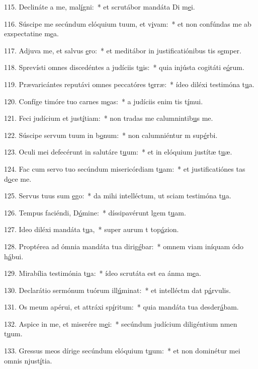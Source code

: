 115. Declináte a me, mal\uline{í}gni:~* et scrutábor mandáta Di m\uline{e}i.\par 
116. Súscipe me secúndum elóquium tuum, et v\uline{i}vam:~* et non confúndas me ab exspectatine m\uline{e}a.\par 
117. Adjuva me, et salvus \uline{e}ro:~* et meditábor in justificatiónibus tis s\uline{e}mper.\par 
118. Sprevísti omnes discedéntes a judíciis t\uline{u}is:~* quia injústa cogitáti e\uline{ó}rum.\par 
119. Prævaricántes reputávi omnes peccatóres t\uline{e}rræ:~* ídeo diléxi testimóna t\uline{u}a.\par 
120. Confíge timóre tuo carnes m\uline{e}as:~* a judíciis enim tis t\uline{í}mui.\par 
121. Feci judícium et just\uline{í}tiam:~* non tradas me calumnintib\uline{u}s me.\par 
122. Súscipe servum tuum in b\uline{o}num:~* non calumniéntur m sup\uline{é}rbi.\par 
123. Oculi mei defecérunt in salutáre t\uline{u}um:~* et in elóquium justítæ t\uline{u}æ.\par 
124. Fac cum servo tuo secúndum misericórdiam t\uline{u}am:~* et justificatiónes tas d\uline{o}ce me.\par 
125. Servus tuus sum \uline{e}go:~* da mihi intelléctum, ut sciam testimóna t\uline{u}a.\par 
126. Tempus faciéndi, D\uline{ó}mine:~* díssipavérunt lgem t\uline{u}am.\par 
127. Ideo diléxi mandáta t\uline{u}a,~* super aurum t top\uline{á}zion.\par 
128. Proptérea ad ómnia mandáta tua dirig\uline{é}bar:~* omnem viam iníquam ódo h\uline{á}bui.\par 
129. Mirabília testimónia t\uline{u}a:~* ídeo scrutáta est ea ánma m\uline{e}a.\par 
130. Declarátio sermónum tuórum ill\uline{ú}minat:~* et intelléctm dat p\uline{á}rvulis.\par 
131. Os meum apérui, et attráxi sp\uline{í}ritum:~* quia mandáta tua desder\uline{á}bam.\par 
132. Aspice in me, et miserére m\uline{e}i:~* secúndum judícium diligéntium nmen t\uline{u}um.\par 
133. Gressus meos dírige secúndum elóquium t\uline{u}um:~* et non dominétur mei omnis njust\uline{í}tia.\par 
